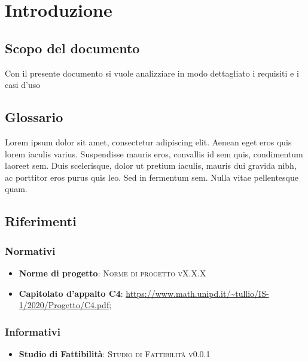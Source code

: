 \documentclass{article}
\begin{document}


\section{Introduzione}%
\label{sec:introduzione}

\subsection{Scopo del documento}%
\label{sub:scopo_del_documento}
Con il presente documento si vuole analizziare in modo dettagliato i requisiti e i casi d'uso 

\subsection{Glossario}%
\label{sub:glossario}
Lorem ipsum dolor sit amet, consectetur adipiscing elit. Aenean eget eros quis lorem iaculis varius. Suspendisse mauris eros, convallis id sem quis, condimentum laoreet sem. Duis scelerisque, dolor ut pretium iaculis, mauris dui gravida nibh, ac porttitor eros purus quis leo. Sed in fermentum sem. Nulla vitae pellentesque quam.

\subsection{Riferimenti}%
\label{sub:riferimenti}

\subsubsection{Normativi}%
\label{subs:normativi}

    \begin{itemize}
    \item \textbf{Norme di progetto}: \textsc{Norme di progetto vX.X.X}
    \item \textbf{Capitolato d’appalto C4}: \url{https://www.math.unipd.it/~tullio/IS-1/2020/Progetto/C4.pdf};
    \end{itemize}

\subsubsection{Informativi}%
\label{subs:informativi}
    \begin{itemize}
    \item \textbf{Studio di Fattibilità}: \textsc{Studio di Fattibilità v0.0.1}
    \end{itemize}
\end{document}
